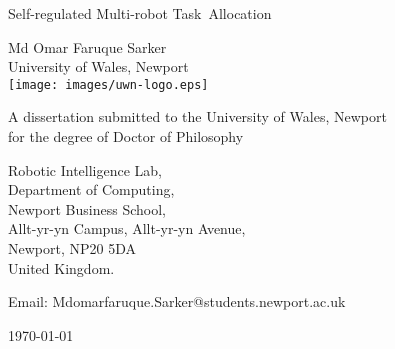 %
%
%
%
\begin{titlepage}

\begin{center}
\noindent
\huge
Self-regulated Multi-robot Task~Allocation
\end{center}

\begin{center}
\noindent
\huge
Md Omar Faruque Sarker\\[10pt]
\large
University of Wales, Newport\\[16pt]
\texttt{[image: images/uwn-logo.eps]}
\end{center}

\begin{center}
\noindent
\large
A dissertation submitted to the University of Wales, Newport\\
for the degree of Doctor of Philosophy\\
\end{center}

\begin{center}
\noindent
Robotic Intelligence Lab,\\
Department of Computing,\\
Newport Business School,\\
Allt-yr-yn Campus, Allt-yr-yn Avenue, \\
Newport, NP20 5DA\\
United Kingdom.\\
\end{center}

\begin{center}
\noindent
Email: Mdomarfaruque.Sarker@students.newport.ac.uk \\
\end{center}

\begin{center}
\noindent
\today
\end{center}


\end{titlepage}
